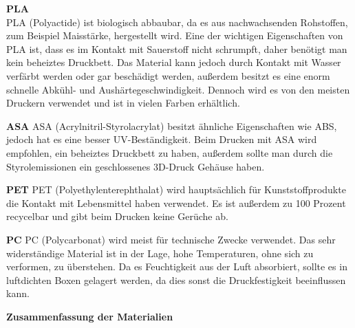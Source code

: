 \textbf{PLA}\\
PLA (Polyactide) ist biologisch abbaubar, da es aus nachwachsenden Rohstoffen, zum Beispiel Maisstärke, hergestellt wird.
Eine der wichtigen Eigenschaften von PLA ist, dass es im Kontakt mit Sauerstoff nicht schrumpft, daher benötigt man kein beheiztes Druckbett.
Das Material kann jedoch durch Kontakt mit Wasser verfärbt werden oder gar beschädigt werden, außerdem besitzt
es eine enorm schnelle Abkühl- und Aushärtegeschwindigkeit.
Dennoch wird es von den meisten Druckern verwendet und ist in vielen Farben erhältlich.

\textbf{ASA}
\acs{ASA} (Acrylnitril-Styrolacrylat) besitzt ähnliche Eigenschaften wie ABS, jedoch hat es eine besser UV-Beständigkeit.
Beim Drucken mit ASA wird empfohlen, ein beheiztes Druckbett zu haben, außerdem sollte man durch die Styrolemissionen
ein geschlossenes 3D-Druck Gehäuse haben.

\textbf{PET}
PET (Polyethylenterephthalat) wird hauptsächlich für Kunststoffprodukte die Kontakt mit Lebensmittel haben verwendet.
Es ist außerdem zu 100 Prozent recycelbar und gibt beim Drucken keine Gerüche ab.

\textbf{PC}
PC (Polycarbonat) wird meist für technische Zwecke verwendet.
Das sehr widerständige Material ist in der Lage, hohe Temperaturen, ohne sich zu verformen, zu überstehen.
Da es Feuchtigkeit aus der Luft absorbiert, sollte es in luftdichten Boxen gelagert werden, da dies sonst die Druckfestigkeit beeinflussen kann.

\textbf{Zusammenfassung der Materialien}

\begin{table}[H]
    \centering
    \caption{Vergleich der 3D-Druck Materialien}
\end{table}

